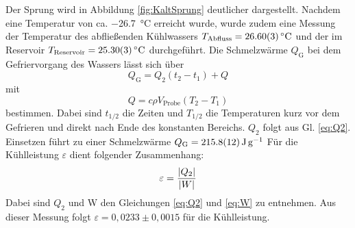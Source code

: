 	Der Sprung wird in Abbildung \ref{fig:KaltSprung} deutlicher dargestellt.
	Nachdem eine Temperatur  von ca. \SI{-26,7}{\celsius} erreicht wurde, wurde zudem eine Messung der Temperatur des abfließenden Kühlwassers $T_\text{Abfluss} = \SI{26,6+-0,03}{\celsius}$ und der im Reservoir $T_\text{Reservoir} = \SI{25,3+-0,03}{\celsius}$ durchgeführt.
	Die Schmelzwärme $Q_\text{G}$ bei dem Gefriervorgang des Wassers lässt sich über 
	\begin{equation} %
		Q_\text{G} = Q_2 (t_2 - t_1) + Q
	\end{equation} %
	mit
	\begin{equation} \label{eq:Q} %
		Q = c \rho V_\text{Probe} (T_2 - T_1)
	\end{equation} %
	bestimmen.
	Dabei sind $t_{1/2}$ die Zeiten und $T_{1/2}$ die Temperaturen kurz vor dem Gefrieren und direkt nach Ende des konstanten Bereichs.
	$Q_2$ folgt aus Gl. \ref{eq:Q2}.
	Einsetzen führt zu einer Schmelzwärme $Q_\text{G} = \SI{215.8+-1.2}{\joule\per\gram}$ 
	Für die Kühlleistung $\varepsilon$ dient folgender Zusammenhang:
	\begin{equation} \label{eq:eps} %
		\varepsilon = \frac{\abs{Q_2}}{\abs{W}}
	\end{equation} %
	Dabei sind $Q_2$ und W den Gleichungen \ref{eq:Q2} und \ref{eq:W} zu entnehmen.
	Aus dieser Messung folgt $\varepsilon = 0,0233\pm 0,0015$ für die Kühlleistung.
		
